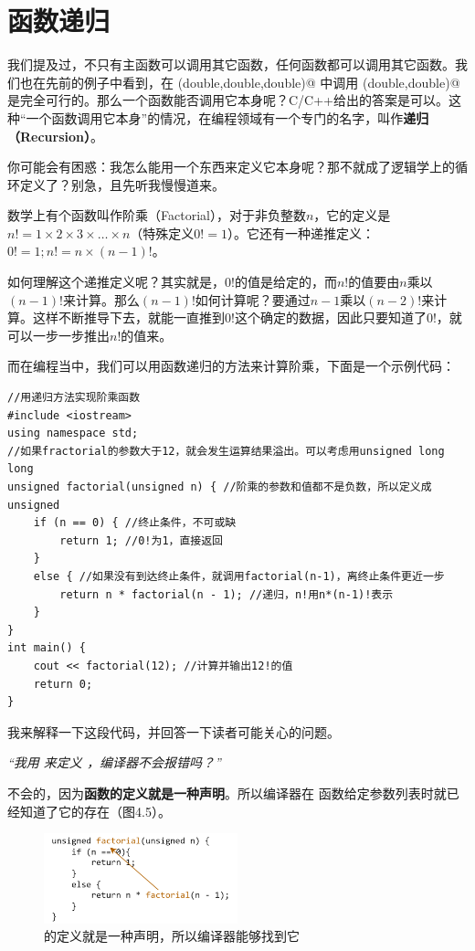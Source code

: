 \section{函数递归}
我们提及过，不只有主函数可以调用其它函数，任何函数都可以调用其它函数。我们也在先前的例子中看到，在 \lstinline@max(double,double,double)@ 中调用 \lstinline@max(double,double)@ 是完全可行的。那么一个函数能否调用它本身呢？C/C++给出的答案是可以。这种``一个函数调用它本身''的情况，在编程领域有一个专门的名字，叫作\textbf{递归（Recursion）}。\par
你可能会有困惑：我怎么能用一个东西来定义它本身呢？那不就成了逻辑学上的循环定义了？别急，且先听我慢慢道来。\par
数学上有个函数叫作阶乘（Factorial），对于非负整数$n$，它的定义是$n!=1\times2\times3\times\ldots\times n$（特殊定义$0!=1$）。它还有一种递推定义：$0!=1; n!=n\times(n-1)!$。\par
如何理解这个递推定义呢？其实就是，$0!$的值是给定的，而$n!$的值要由$n$乘以$(n-1)!$来计算。那么$(n-1)!$如何计算呢？要通过$n-1$乘以$(n-2)!$来计算。这样不断推导下去，就能一直推到$0!$这个确定的数据，因此只要知道了$0!$，就可以一步一步推出$n!$的值来。\par
而在编程当中，我们可以用函数递归的方法来计算阶乘，下面是一个示例代码：
\begin{lstlisting}[caption=\texttt{Factorial\_with\_Recursion.cpp},label=lst:FactorialWithRecursion]
//用递归方法实现阶乘函数
#include <iostream>
using namespace std;
//如果fractorial的参数大于12，就会发生运算结果溢出。可以考虑用unsigned long long
unsigned factorial(unsigned n) { //阶乘的参数和值都不是负数，所以定义成unsigned
    if (n == 0) { //终止条件，不可或缺
        return 1; //0!为1，直接返回
    }
    else { //如果没有到达终止条件，就调用factorial(n-1)，离终止条件更近一步
        return n * factorial(n - 1); //递归，n!用n*(n-1)!表示
    }
}
int main() {
    cout << factorial(12); //计算并输出12!的值
    return 0;
}
\end{lstlisting}
我来解释一下这段代码，并回答一下读者可能关心的问题。\par
\textit{``我用 \lstinline@factorial@ 来定义 \lstinline@factorial@，编译器不会报错吗？''}\par
不会的，因为\textbf{函数的定义就是一种声明}。所以编译器在 \lstinline@factorial@ 函数给定参数列表时就已经知道了它的存在（图4.5）。\par
\begin{figure}[htbp]
    \centering
    \includegraphics[width=0.5\textwidth]{../images/generalized_parts/04_factorial_code_logic_300.png}
    \caption{\lstinline@factorial@ 的定义就是一种声明，所以编译器能够找到它}
\end{figure}
